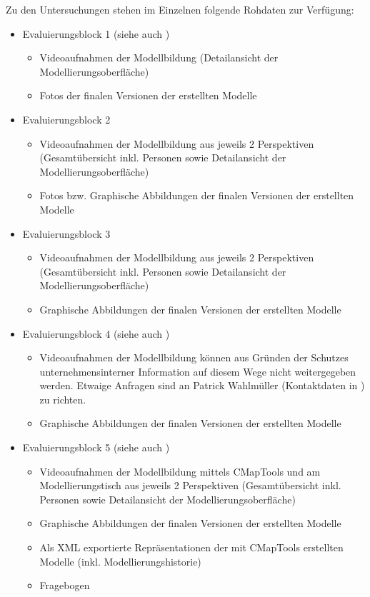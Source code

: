 Zu den Untersuchungen stehen im Einzelnen folgende Rohdaten zur Verfügung:
\begin{itemize}
	\item Evaluierungsblock 1 (siehe auch \citep{Bohninger10})
		\begin{itemize}
			\item Videoaufnahmen der Modellbildung (Detailansicht der Modellierungsoberfläche)
			\item Fotos der finalen Versionen der erstellten Modelle
		\end{itemize}
	\item Evaluierungsblock 2
		\begin{itemize}
			\item Videoaufnahmen der Modellbildung aus jeweils 2 Perspektiven (Gesamtübersicht inkl. Personen sowie Detailansicht der Modellierungsoberfläche)
			\item Fotos bzw. Graphische Abbildungen der finalen Versionen der erstellten Modelle
		\end{itemize}
	\item Evaluierungsblock 3
		\begin{itemize}
			\item Videoaufnahmen der Modellbildung aus jeweils 2 Perspektiven (Gesamtübersicht inkl. Personen sowie Detailansicht der Modellierungsoberfläche)
			\item Graphische Abbildungen der finalen Versionen der erstellten Modelle
		\end{itemize}
	\item Evaluierungsblock 4 (siehe auch \citep{Wahlmuller10})
		\begin{itemize}
			\item Videoaufnahmen der Modellbildung können aus Gründen der Schutzes unternehmensinterner Information auf diesem Wege nicht weitergegeben werden. Etwaige Anfragen sind an Patrick Wahlmüller (Kontaktdaten in \citep{Wahlmuller10}) zu richten.
			\item Graphische Abbildungen der finalen Versionen der erstellten Modelle
		\end{itemize}
	\item Evaluierungsblock 5 (siehe auch \citep{Bindreiter10})
		\begin{itemize}
			\item Videoaufnahmen der Modellbildung mittels CMapTools und am Modellierungstisch aus jeweils 2 Perspektiven (Gesamtübersicht inkl. Personen sowie Detailansicht der Modellierungsoberfläche)
			\item Graphische Abbildungen der finalen Versionen der erstellten Modelle
			\item Als XML exportierte Repräsentationen der mit CMapTools erstellten Modelle (inkl. Modellierungshistorie)
			\item Fragebogen 
		\end{itemize}
\end{itemize}


